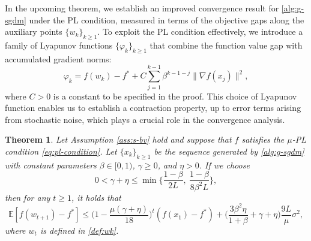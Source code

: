 \documentclass[10pt]{article}
\numberwithin{equation}{section}
\newtheorem{theorem}{Theorem}
\theoremstyle{definition}
\newcommand{\ebb}{\mathbb{E}}  %
\begin{document}
In the upcoming theorem, we establish an improved convergence result for \eqref{alg:g-sgdm} under the PL condition, measured in terms of the objective gaps along the auxiliary points $\{w_k\}_{k\ge 1}$. To exploit the PL condition effectively, we introduce a family of Lyapunov functions $\{\varphi_k\}_{k\ge 1}$ that combine the function value gap with accumulated gradient norms:
\begin{equation}\label{def:varphi}
\varphi_k=f(w_k)-f^*+C \sum_{j=1}^{k-1} \beta^{k-1-j}\|\nabla f(x_j)\|^2,
\end{equation}
where $C>0$ is a constant to be specified in the proof. This choice of Lyapunov function enables us to establish a contraction property, up to error terms arising from stochastic noise, which plays a crucial role in the convergence analysis.
%
\begin{theorem}\label{thm:pl}
Let Assumption \ref{ass:s-bv} hold and suppose that $f$ satisfies the $\mu$-PL condition \eqref{eq:pl-condition}. Let $\{x_k\}_{k\ge 1}$ be the sequence generated by \eqref{alg:g-sgdm} with constant parameters $\beta\in [0,1)$, $\gamma\ge 0$, and $\eta>0$. If we choose
\begin{equation}\label{eq:pl-lr}
    0<\gamma+\eta \leq \min\Big\{\frac{1-\beta}{2 L},~\frac{1-\beta}{8 \beta^2 L}\Big\},
\end{equation}
then for any $t\ge 1$, it holds that
\[
\ebb[f(w_{t+1})-f^*]\leq\Big(1-\frac{\mu(\gamma+\eta)}{18}\Big)^{t}(f(x_1)-f^*)+\Big(\frac{3 \beta^2 \eta}{1+\beta}+\gamma+\eta\Big) \frac{9L}{\mu} \sigma^2,
\]
where $w_t$ is defined in \eqref{def:wk}.
\end{theorem}
\end{document}
